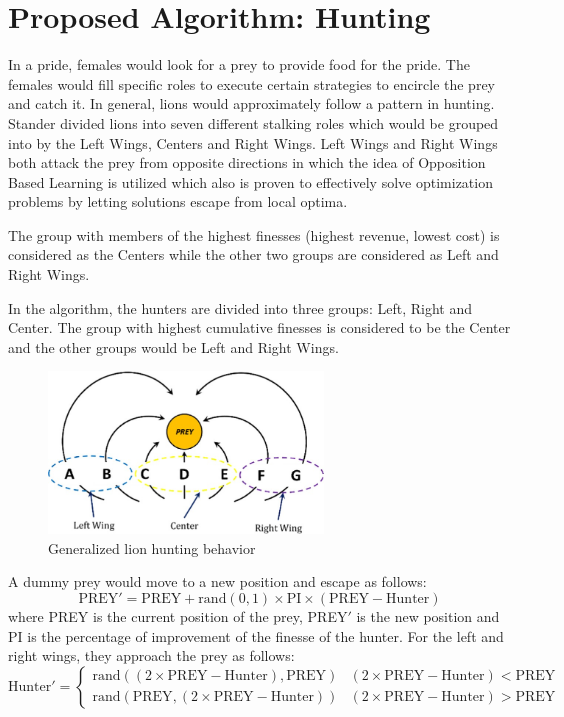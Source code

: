 \section{Proposed Algorithm: Hunting}
\par In a pride, females would look for a prey to provide food for the pride. The females would fill specific roles to execute certain strategies to encircle the prey and catch it. In general, lions would approximately follow a pattern in hunting. Stander divided lions into seven different stalking roles which would be grouped into by the Left Wings, Centers and Right Wings.
Left Wings and Right Wings both attack the prey from opposite directions in which the idea of Opposition Based Learning is utilized which also is proven to effectively solve optimization problems by letting solutions escape from local optima.
\par The group with members of the highest finesses (highest revenue, lowest cost) is considered as the Centers while the other two groups are considered as Left and Right Wings.
\par In the algorithm, the hunters are divided into three groups: Left, Right and Center. The group with highest cumulative finesses is considered to be the Center and the other groups would be Left and Right Wings.
\begin{figure}[h]
\begin{center}
\includegraphics[width=0.65\textwidth]{img/pa/hunting_scheme}
\caption{Generalized lion hunting behavior}
\end{center}
\end{figure}
A dummy prey would move to a new position and escape as follows:
$$\text{PREY}' = \text{PREY} + \text{rand}(0,1) \times \text{PI} \times (\text{PREY} - \text{Hunter})$$
where PREY is the current position of the prey, PREY$'$ is the new position and PI is the percentage of improvement of the finesse of the hunter.
For the left and right wings, they approach the prey as follows:
\[ \text{Hunter}' =  \begin{cases}
      \text{rand}((2 \times \text{PREY} - \text{Hunter}), \text{PREY}) & (2 \times \text{PREY} - \text{Hunter}) < \text{PREY} \\
      \text{rand}(\text{PREY}, (2 \times \text{PREY} - \text{Hunter})) & (2 \times \text{PREY} - \text{Hunter}) > \text{PREY}
   \end{cases}
\]
